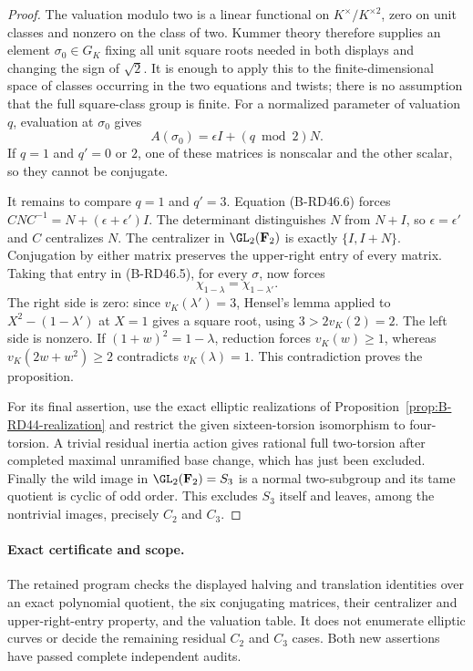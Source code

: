 \begin{proof}
The valuation modulo two is a linear functional on
$K^\times/K^{\times2}$, zero on unit classes and nonzero on
the class of two. Kummer theory therefore supplies an element
$\sigma_0\in G_K$ fixing all unit square roots needed in both
displays and changing the sign of $\sqrt2$.
It is enough to apply this to the finite-dimensional space of
classes occurring in the two equations and twists; there is no
assumption that the full square-class group is finite.
For a normalized parameter of valuation $q$, evaluation at
$\sigma_0$ gives
\[
                       A(\sigma_0)=\epsilon I+(q\bmod2)N.
                                                               \tag{B-RD46.6}
\]
If $q=1$ and $q'=0$ or $2$, one of these matrices is nonscalar
and the other scalar, so they cannot be conjugate.

It remains to compare $q=1$ and $q'=3$.
Equation (B-RD46.6) forces
$CNC^{-1}=N+(\epsilon+\epsilon')I$.
The determinant distinguishes $N$ from $N+I$, so
$\epsilon=\epsilon'$ and $C$ centralizes $N$.
The centralizer in $\GL_2(\mathbf F_2)$ is exactly
$\{I,I+N\}$. Conjugation by either matrix preserves the
upper-right entry of every matrix. Taking that entry in
(B-RD46.5), for every $\sigma$, now forces
\[
                         \chi_{1-\lambda}
                              =\chi_{1-\lambda'}.       \tag{B-RD46.7}
\]
The right side is zero: since $v_K(\lambda')=3$,
Hensel's lemma applied to $X^2-(1-\lambda')$ at $X=1$
gives a square root, using $3>2v_K(2)=2$.
The left side is nonzero. If $(1+w)^2=1-\lambda$, reduction
forces $v_K(w)\ge1$, whereas
$v_K(2w+w^2)\ge2$ contradicts $v_K(\lambda)=1$.
This contradiction proves the proposition.

For its final assertion, use the exact elliptic realizations
of Proposition~\ref{prop:B-RD44-realization} and restrict the
given sixteen-torsion isomorphism to four-torsion. A trivial
residual inertia action gives rational full two-torsion after
completed maximal unramified base change, which has just been
excluded. Finally the wild image in $\GL_2(\mathbf F_2)=S_3$
is a normal two-subgroup and its tame quotient is cyclic of
odd order. This excludes $S_3$ itself and leaves, among the
nontrivial images, precisely $C_2$ and $C_3$.
\end{proof}

\paragraph{Exact certificate and scope.}
The retained program
checks the displayed halving and translation identities over an
exact polynomial quotient, the six conjugating matrices, their
centralizer and upper-right-entry property, and the valuation
table. It does not enumerate elliptic curves or decide the
remaining residual $C_2$ and $C_3$ cases. Both new assertions have passed complete independent audits.

